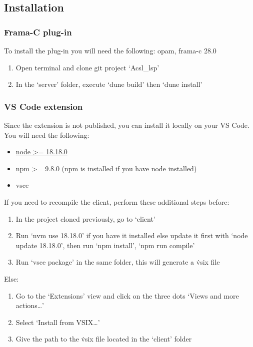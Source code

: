 \documentclass[10pt]{article}
\begin{document}
\begin{singlespace}
\color{magenta}
\part{Installation}
\section{Frama-C plug-in}
To install the plug-in you will need the following: opam, frama-c 28.0
\begin{enumerate}
	\item Open terminal and clone git project `Acsl\_lsp'
	\item In the `server' folder, execute `dune build' then `dune install'
\end{enumerate}

\section{VS Code extension}
Since the extension is not published, you can install it locally on your VS Code.
You will need the following: 
\begin{itemize}
	\item \href{https://github.com/nvm-sh/nvm?tab=readme-ov-file#installing-and-updating}{node >= 18.18.0}
	\item npm >= 9.8.0 (npm is installed if you have node installed)
	\item vsce
\end{itemize}
If you need to recompile the client, perform these additional steps before:
\begin{enumerate}
	\item In the project cloned previously, go to `client'
	\item Run `nvm use 18.18.0' if you have it installed else update it first with `node update 18.18.0', then run `npm install', `npm run compile' 
	\item Run `vsce package' in the same folder, this will generate a \.vsix file
\end{enumerate}
Else: 
\begin{enumerate}
	\item Go to the `Extensions' view and click on the three dots `Views and more actions\ldots'
	\item Select `Install from VSIX\ldots'
	\item Give the path to the \.vsix file located in the `client' folder
\end{enumerate}
\color{black}


\end{singlespace}
\end{document}
